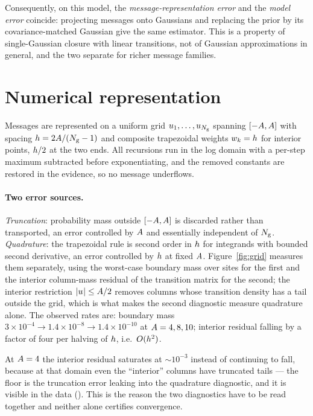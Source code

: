 Consequently, on this model, the \emph{message-representation error} and the \emph{model error}
coincide: projecting messages onto Gaussians and replacing the prior by its covariance-matched
Gaussian give the same estimator. This is a property of single-Gaussian closure with linear
transitions, not of Gaussian approximations in general, and the two separate for richer message
families.

\section{Numerical representation}
\label{app:numerics}

Messages are represented on a uniform grid $u_{1},\dots,u_{N_{\mathrm{g}}}$ spanning
$[-A,A]$ with spacing $h = 2A/(N_{\mathrm{g}}-1)$ and composite
trapezoidal weights $w_k = h$ for interior points, $h/2$ at the two ends. All
recursions run in the log domain with a per-step maximum subtracted before exponentiating, and
the removed constants are restored in the evidence, so no message underflows.

\paragraph{Two error sources.} \emph{Truncation}: probability mass outside
$[-A,A]$ is discarded rather than transported, an error controlled by
$A$ and essentially independent of $N_{\mathrm{g}}$. \emph{Quadrature}: the trapezoidal rule is
second order in $h$ for integrands with bounded second derivative, an error controlled by
$h$ at fixed $A$. Figure~\ref{fig:grid} measures them separately, using the
worst-case boundary mass over sites for the first and the interior column-mass residual of the
transition matrix for the second; the interior restriction $|u_{}| \le A/2$ removes
columns whose transition density has a tail outside the grid, which is what makes the second
diagnostic measure quadrature alone. The observed rates are: boundary mass
$3\times10^{-4} \to 1.4\times10^{-8} \to 1.4\times10^{-10}$ at $A = 4, 8, 10$; interior
residual falling by a factor of four per halving of $h$, i.e.\ $O(h^2)$.

At $A=4$ the interior residual saturates at $\sim10^{-3}$ instead of continuing to fall,
because at that domain even the ``interior'' columns have truncated tails --- the floor is the
truncation error leaking into the quadrature diagnostic, and it is visible in the data
(). This is the reason the two diagnostics have to be read
together and neither alone certifies convergence.

